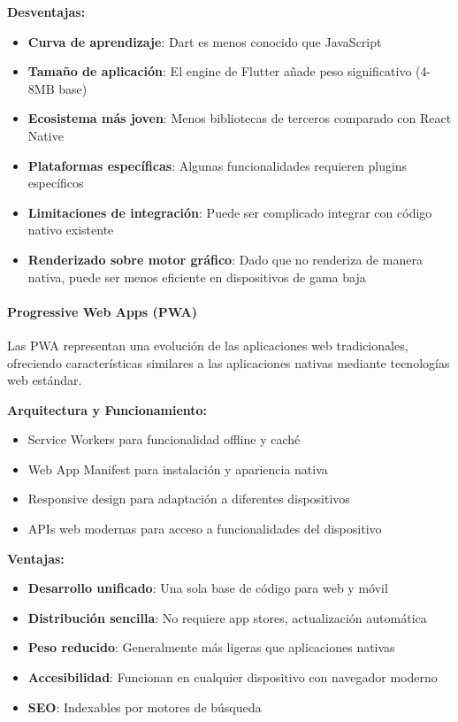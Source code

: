 \textbf{Desventajas:}
\begin{itemize}
    \item \textbf{Curva de aprendizaje}: Dart es menos conocido que JavaScript
    \item \textbf{Tamaño de aplicación}: El engine de Flutter añade peso significativo (4-8MB base)
    \item \textbf{Ecosistema más joven}: Menos bibliotecas de terceros comparado con React Native
    \item \textbf{Plataformas específicas}: Algunas funcionalidades requieren plugins específicos
    \item \textbf{Limitaciones de integración}: Puede ser complicado integrar con código nativo existente
    \item \textbf{Renderizado sobre motor gráfico}: Dado que no renderiza de manera nativa, puede ser menos eficiente en dispositivos de gama baja
\end{itemize}

\paragraph{Progressive Web Apps (PWA)}

Las PWA representan una evolución de las aplicaciones web tradicionales, ofreciendo características similares a las aplicaciones nativas mediante tecnologías web estándar.

\textbf{Arquitectura y Funcionamiento:}
\begin{itemize}
    \item Service Workers para funcionalidad offline y caché
    \item Web App Manifest para instalación y apariencia nativa
    \item Responsive design para adaptación a diferentes dispositivos
    \item APIs web modernas para acceso a funcionalidades del dispositivo
\end{itemize}

\textbf{Ventajas:}
\begin{itemize}
    \item \textbf{Desarrollo unificado}: Una sola base de código para web y móvil
    \item \textbf{Distribución sencilla}: No requiere app stores, actualización automática
    \item \textbf{Peso reducido}: Generalmente más ligeras que aplicaciones nativas
    \item \textbf{Accesibilidad}: Funcionan en cualquier dispositivo con navegador moderno
    \item \textbf{SEO}: Indexables por motores de búsqueda
\end{itemize}

